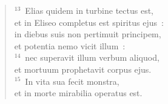 \begin{flushleft}\begin{verse}${}^{13}$~Elias quidem in turbine tectus est,\\ et in Eliseo completus est spiritus ejus~:\\ in diebus suis non pertimuit principem,\\ et potentia nemo vicit illum~:\\
${}^{14}$~nec superavit illum verbum aliquod,\\ et mortuum prophetavit corpus ejus.\\
${}^{15}$~In vita sua fecit monstra,\\ et in morte mirabilia operatus est.\end{verse}\end{flushleft}


